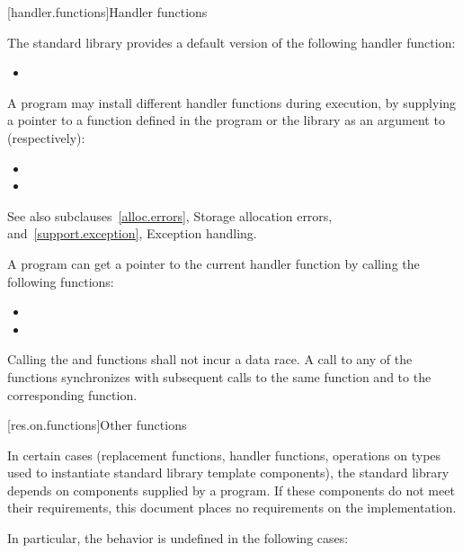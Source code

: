 [handler.functions]{Handler functions}

\pnum
The \Cpp{} standard library provides a default version of the following handler
function:

\begin{itemize}
\item
{}
%
\end{itemize}

\pnum
A \Cpp{} program may install different handler functions during execution, by
supplying a pointer to a function defined in the program or the library
as an argument to (respectively):
\begin{itemize}
\item {}
\item {}
\end{itemize}
See also subclauses~\ref{alloc.errors}, Storage allocation errors, and~\ref{support.exception},
Exception handling.

\pnum
A \Cpp{} program can get a pointer to the current handler function by calling the following
functions:

\begin{itemize}
\item
{}%
\item
{}
\end{itemize}

\pnum
Calling the  and  functions shall not incur a data race.
A call to any of the  functions synchronizes with subsequent calls to the same
 function and to the corresponding  function.

[res.on.functions]{Other functions}

\pnum
In certain cases (replacement functions, handler functions, operations on types used to
instantiate standard library template components), the \Cpp{} standard library depends on
components supplied by a \Cpp{} program.
If these components do not meet their requirements, this document places no requirements
on the implementation.

\pnum
In particular, the behavior is undefined in the following cases:

